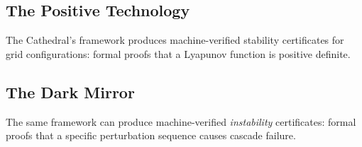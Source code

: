 \documentclass[11pt,a4paper]{article}
\begin{document}
\subsection{The Positive Technology}

The Cathedral's framework produces machine-verified stability
certificates for grid configurations: formal proofs that a
Lyapunov function is positive definite.

\subsection{The Dark Mirror}

The same framework can produce machine-verified \emph{instability}
certificates: formal proofs that a specific perturbation sequence
causes cascade failure.
\end{document}

